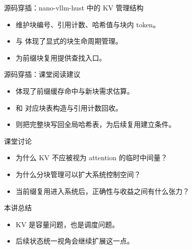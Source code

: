 \begin{frame}{源码穿插：nano-vllm-hust 中的 KV 管理结构}
  \begin{itemize}
    \item \texttt{} 维护块编号、引用计数、哈希值与块内 token。
    \item \texttt{} 与 \texttt{} 体现了显式的块生命周期管理。
    \item \texttt{} 为前缀块复用提供查找入口。
  \end{itemize}
\end{frame}

\begin{frame}{源码穿插：课堂阅读建议}
  \begin{itemize}
    \item \texttt{} 体现了前缀缓存命中与新块需求估算。
    \item \texttt{} 和 \texttt{} 对应块表构造与引用计数回收。
    \item \texttt{} 则把完整块写回全局哈希表，为后续复用建立条件。
  \end{itemize}
\end{frame}



\begin{frame}{课堂讨论}
  \begin{itemize}
    \item 为什么 KV 不应被视为 attention 的临时中间量？
    \item 为什么分块管理可以扩大系统控制空间？
    \item 当前缀复用进入系统后，正确性与收益之间有什么张力？
  \end{itemize}
\end{frame}

\begin{frame}{本讲总结}
  \begin{itemize}
    \item KV 是容量问题，也是调度问题。
    \item 后续状态统一视角会继续扩展这一点。
  \end{itemize}
\end{frame}

